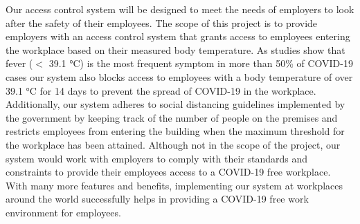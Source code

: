 Our access control system will be designed to meet the needs of employers to
look after the safety of their employees. The scope of this project is to
provide employers with an access control system that grants access to employees
entering the workplace based on their measured body temperature. As studies show
that fever ($<$ 39.1 °C) is the most frequent symptom in more than 50\% of
COVID-19 cases our system also blocks access to employees with a body
temperature of over 39.1 °C for 14 days to prevent the spread of COVID-19 in the
workplace. Additionally, our system adheres to social distancing guidelines
implemented by the government by keeping track of the number of people on the
premises and restricts employees from entering the building when the maximum
threshold for the workplace has been attained. Although not in the scope of the
project, our system would work with employers to comply with their standards and
constraints to provide their employees access to a COVID-19 free workplace. With
many more features and benefits, implementing our system at workplaces around
the world successfully helps in providing a COVID-19 free work environment for
employees.

